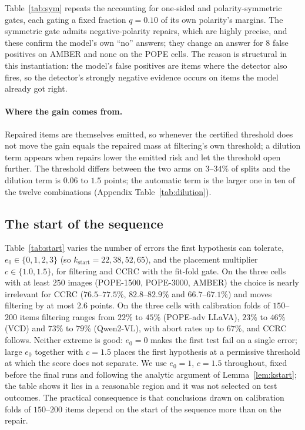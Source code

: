 Table~\ref{tab:sym} repeats the accounting for one-sided and polarity-symmetric gates, each gating a fixed
fraction $q=0.10$ of its own polarity's margins. The symmetric gate admits negative-polarity repairs, which are
highly precise, and these confirm the model's own ``no'' answers; they change an answer for $8$ false positives on AMBER and
none on the POPE cells. The reason is structural in this instantiation: the model's false positives are items where the detector
also fires, so the detector's strongly negative evidence occurs on items the model already got right.

\begin{table}[t]
\centering
\caption{Gate polarity at $\alpha=0.10$, $q=0.10$ per polarity. Gain over filtering in points, repaired items as a
percentage of test items, and the number of false-positive errors corrected (pooled over $400$ test folds).
Pooled margin is the gate used elsewhere in the paper.}
\label{tab:sym}
\small
\resizebox{\textwidth}{!}{}
\end{table}

\paragraph{Where the gain comes from.}
Repaired items are themselves emitted, so whenever the certified threshold does not move the gain equals the repaired mass at filtering's own threshold; a dilution term appears when repairs lower the emitted risk and let the threshold open further. The threshold differs between the two arms on $3$--$34\%$ of splits and the dilution term is $0.06$ to $1.5$ points; the automatic term is the larger one in ten of the twelve combinations (Appendix Table~\ref{tab:dilution}).

\subsection{The start of the sequence}
\label{sec:start}

Table~\ref{tab:start} varies the number of errors the first hypothesis can tolerate, $e_0\in\{0,1,2,3\}$ (so
$k_{\mathrm{start}}=22,38,52,65$), and the placement multiplier $c\in\{1.0,1.5\}$, for filtering and CCRC with the
fit-fold gate. On the three cells with at least $250$ images (POPE-1500, POPE-3000, AMBER) the choice is nearly irrelevant for
CCRC ($76.5$--$77.5\%$, $82.8$--$82.9\%$ and $66.7$--$67.1\%$) and moves filtering by at most $2.6$ points. On the three cells with
calibration folds of $150$--$200$ items filtering ranges from $22\%$ to $45\%$ (POPE-adv LLaVA), $23\%$ to $46\%$ (VCD) and
$73\%$ to $79\%$ (Qwen2-VL), with abort rates up to $67\%$, and CCRC follows. Neither extreme is good: $e_0=0$ makes the first test fail on
a single error; large $e_0$ together with $c=1.5$ places the first hypothesis at a permissive threshold at which the score does not
separate. We use $e_0=1$, $c=1.5$ throughout, fixed before the final runs and following the analytic argument of Lemma~\ref{lem:kstart};
the table shows it lies in a reasonable region and it was not selected on test outcomes. The practical consequence is that conclusions drawn on
calibration folds of $150$--$200$ items depend on the start of the sequence more than on the repair.

